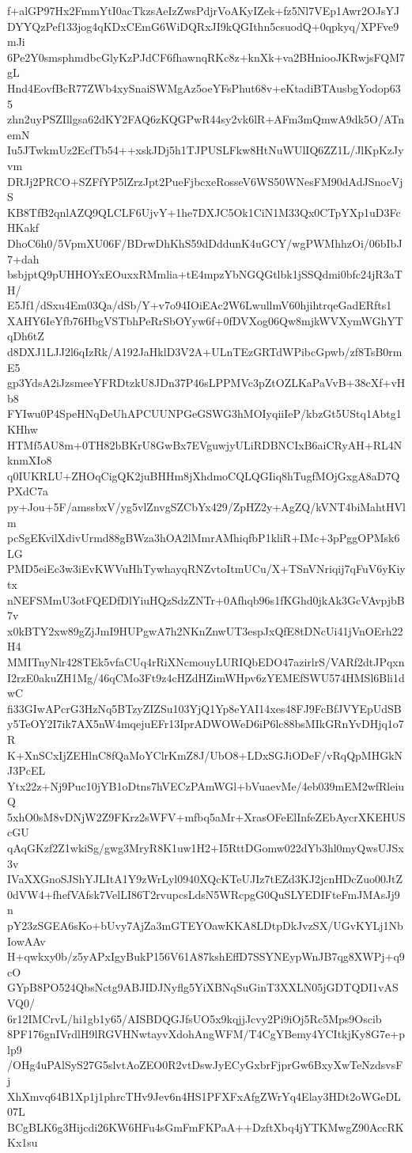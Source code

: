 f+alGP97Hx2FmmYtI0acTkzsAeIzZwsPdjrVoAKyIZek+fz5Nl7VEp1Awr2OJsYJ
DYYQzPef133jog4qKDxCEmG6WiDQRxJI9kQGIthn5csuodQ+0qpkyq/XPFve9mJi
6Pe2Y0smsphmdbcGlyKzPJdCF6fhawnqRKc8z+knXk+va2BHniooJKRwjsFQM7gL
Hnd4EovfBcR77ZWb4xySnaiSWMgAz5oeYFsPhut68v+eKtadiBTAusbgYodop635
zhn2uyPSZIllgsa62dKY2FAQ6zKQGPwR44sy2vk6lR+AFm3mQmwA9dk5O/ATnemN
Iu5JTwkmUz2EcfTb54++xskJDj5h1TJPUSLFkw8HtNuWUlIQ6ZZ1L/JlKpKzJyvm
DRJj2PRCO+SZFfYP5lZrzJpt2PueFjbcxeRosseV6WS50WNesFM90dAdJSnocVjS
KB8TfB2qnlAZQ9QLCLF6UjvY+1he7DXJC5Ok1CiN1M33Qx0CTpYXp1uD3FcHKakf
DhoC6h0/5VpmXU06F/BDrwDhKhS59dDddunK4uGCY/wgPWMhhzOi/06bIbJ7+dah
bsbjptQ9pUHHOYxEOuxxRMmlia+tE4mpzYbNGQGtlbk1jSSQdmi0bfc24jR3aTH/
E5Jf1/dSxu4Em03Qa/dSb/Y+v7o94IOiEAc2W6LwullmV60hjihtrqeGadERfts1
XAHY6IeYfb76HbgVSTbhPeRrSbOYyw6f+0fDVXog06Qw8mjkWVXymWGhYTqDh6tZ
d8DXJ1LJJ2l6qIzRk/A192JaHklD3V2A+ULnTEzGRTdWPibcGpwb/zf8TsB0rmE5
gp3YdsA2iJzsmeeYFRDtzkU8JDn37P46sLPPMVc3pZtOZLKaPaVvB+38cXf+vHb8
FYIwu0P4SpeHNqDeUhAPCUUNPGeGSWG3hMOIyqiiIeP/kbzGt5UStq1Abtg1KHhw
HTMf5AU8m+0TH82bBKrU8GwBx7EVguwjyULiRDBNCIxB6aiCRyAH+RL4NknmXIo8
q0IUKRLU+ZHOqCigQK2juBHHm8jXhdmoCQLQGIiq8hTugfMOjGxgA8aD7QPXdC7a
py+Jou+5F/amssbxV/yg5vlZnvgSZCbYx429/ZpHZ2y+AgZQ/kVNT4biMahtHVlm
pcSgEKvilXdivUrmd88gBWza3hOA2lMmrAMhiqfbP1kliR+IMc+3pPggOPMsk6LG
PMD5eiEc3w3iEvKWVuHhTywhayqRNZvtoItmUCu/X+TSnVNriqij7qFuV6yKiytx
nNEFSMmU3otFQEDfDlYiuHQzSdzZNTr+0Afhqb96s1fKGhd0jkAk3GcVAvpjbB7v
x0kBTY2xw89gZjJmI9HUPgwA7h2NKnZnwUT3espJxQfE8tDNcUi41jVnOErh22H4
MMITnyNlr428TEk5vfaCUq4rRiXNcmouyLURIQbEDO47azirlrS/VARf2dtJPqxn
I2rzE0akuZH1Mg/46qCMo3Ft9z4cHZdHZimWHpv6zYEMEfSWU574HMSl6Bli1dwC
fi33GIwAPcrG3HzNq5BTzyZIZSu103YjQ1Yp8eYAI14xes48FJ9FcBfJVYEpUdSB
y5TeOY2I7ik7AX5nW4mqejuEFr13IprADWOWeD6iP6lc88bsMIkGRnYvDHjq1o7R
K+XnSCxIjZEHlnC8fQaMoYClrKmZ8J/UbO8+LDxSGJiODeF/vRqQpMHGkNJ3PcEL
Ytx22z+Nj9Puc10jYB1oDtns7hVECzPAmWGl+bVuaevMe/4eb039mEM2wfRleiuQ
5xhO0sM8vDNjW2Z9FKrz2sWFV+mfbq5aMr+XrasOFeElInfeZEbAycrXKEHUScGU
qAqGKzf2Z1wkiSg/gwg3MryR8K1uw1H2+I5RttDGomw022dYb3hl0myQwsUJSx3v
IVaXXGnoSJShYJLItA1Y9zWrLyl0940XQcKTeUJIz7tEZd3KJ2jcnHDcZuo00JtZ
0dVW4+fhefVAfsk7VelLI86T2rvupcsLdsN5WRcpgG0QuSLYEDIFteFmJMAsJj9n
pY23zSGEA6sKo+bUvy7AjZa3mGTEYOawKKA8LDtpDkJvzSX/UGvKYLj1NbIowAAv
H+qwkxy0b/z5yAPxIgyBukP156V61A87kshEffD7SSYNEypWnJB7qg8XWPj+q9cO
GYpB8PO524QbsNctg9ABJIDJNyflg5YiXBNqSuGinT3XXLN05jGDTQDI1vASVQ0/
6r12IMCrvL/hi1gb1y65/AISBDQGJfsUO5x9kqjjJcvy2Pi9iOj5Rc5Mps9Oscib
8PF176gnIVrdlH9lRGVHNwtayvXdohAngWFM/T4CgYBemy4YCItkjKy8G7e+plp9
/OHg4uPAlSyS27G5slvtAoZEO0R2vtDswJyECyGxbrFjprGw6BxyXwTeNzdsvsFj
XhXmvq64B1Xp1j1phrcTHv9Jev6n4HS1PFXFxAfgZWrYq4Elay3HDt2oWGeDL07L
BCgBLK6g3Hijcdi26KW6HFu4sGmFmFKPaA++DzftXbq4jYTKMwgZ90AccRKKx1su
